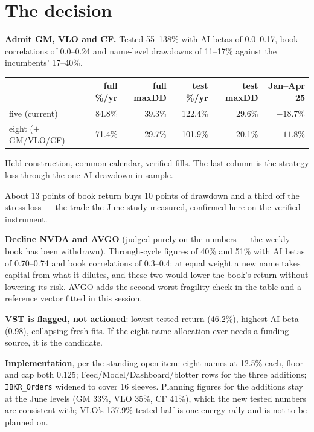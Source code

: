 \documentclass[11pt,a4paper]{article}
\newcommand{\tabnote}[1]{\begin{center}\begin{minipage}{0.92\textwidth}
  \footnotesize\color{bcgrey}#1\end{minipage}\end{center}}
\begin{document}
\section{The decision}

\textbf{Admit GM, VLO and CF.} Tested 55--138\% with AI betas of 0.0--0.17, book
correlations of 0.0--0.24 and name-level drawdowns of 11--17\% against the
incumbents' 17--40\%.

\begin{center}
\begin{tabular}{lrrrr|r}
\toprule
 & full \%/yr & full maxDD & test \%/yr & test maxDD & Jan--Apr 25 \\
\midrule
five (current)       & 84.8\% & 39.3\% & 122.4\% & 29.6\% & $-18.7\%$ \\
eight ($+$GM/VLO/CF) & 71.4\% & 29.7\% & 101.9\% & 20.1\% & $-11.8\%$ \\
\bottomrule
\end{tabular}
\end{center}

\tabnote{Held construction, common calendar, verified fills. The last column is
the strategy loss through the one AI drawdown in sample.}

About 13 points of book return buys 10 points of drawdown and a third off the
stress loss --- the trade the June study measured, confirmed here on the verified
instrument.

\textbf{Decline NVDA and AVGO} (judged purely on the numbers --- the weekly book
has been withdrawn). Through-cycle figures of 40\% and 51\% with AI betas of 0.70--0.74 and book
correlations of 0.3--0.4: at equal weight a new name takes capital from what it
dilutes, and these two would lower the book's return without lowering its risk.
AVGO adds the second-worst fragility check in the table and a reference vector
fitted in this session.

\textbf{VST is flagged, not actioned}: lowest tested return (46.2\%), highest AI
beta (0.98), collapsing fresh fits. If the eight-name allocation ever needs a
funding source, it is the candidate.

\textbf{Implementation}, per the standing open item: eight names at 12.5\% each,
floor and cap both 0.125; Feed/Model/Dashboard/blotter rows for the three
additions; \texttt{IBKR\_Orders} widened to cover 16 sleeves. Planning figures for
the additions stay at the June levels (GM 33\%, VLO 35\%, CF 41\%), which the new
tested numbers are consistent with; VLO's 137.9\% tested half is one energy rally
and is not to be planned on.
\end{document}
